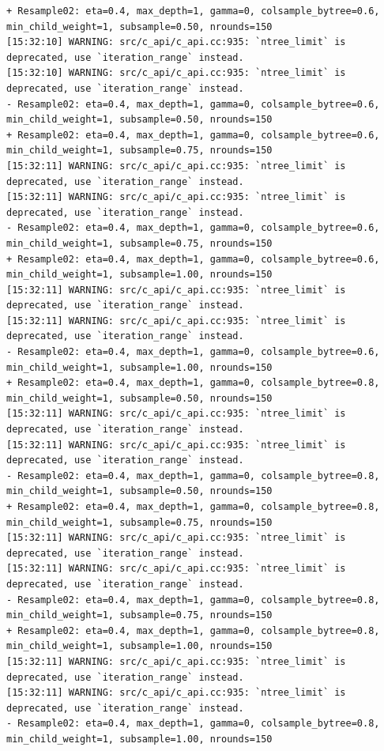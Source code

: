 \documentclass[
  letterpaper,
  DIV=11,
  numbers=noendperiod]{scrartcl}
\begin{document}
\begin{verbatim}
+ Resample02: eta=0.4, max_depth=1, gamma=0, colsample_bytree=0.6, min_child_weight=1, subsample=0.50, nrounds=150 
[15:32:10] WARNING: src/c_api/c_api.cc:935: `ntree_limit` is deprecated, use `iteration_range` instead.
[15:32:10] WARNING: src/c_api/c_api.cc:935: `ntree_limit` is deprecated, use `iteration_range` instead.
- Resample02: eta=0.4, max_depth=1, gamma=0, colsample_bytree=0.6, min_child_weight=1, subsample=0.50, nrounds=150 
+ Resample02: eta=0.4, max_depth=1, gamma=0, colsample_bytree=0.6, min_child_weight=1, subsample=0.75, nrounds=150 
[15:32:11] WARNING: src/c_api/c_api.cc:935: `ntree_limit` is deprecated, use `iteration_range` instead.
[15:32:11] WARNING: src/c_api/c_api.cc:935: `ntree_limit` is deprecated, use `iteration_range` instead.
- Resample02: eta=0.4, max_depth=1, gamma=0, colsample_bytree=0.6, min_child_weight=1, subsample=0.75, nrounds=150 
+ Resample02: eta=0.4, max_depth=1, gamma=0, colsample_bytree=0.6, min_child_weight=1, subsample=1.00, nrounds=150 
[15:32:11] WARNING: src/c_api/c_api.cc:935: `ntree_limit` is deprecated, use `iteration_range` instead.
[15:32:11] WARNING: src/c_api/c_api.cc:935: `ntree_limit` is deprecated, use `iteration_range` instead.
- Resample02: eta=0.4, max_depth=1, gamma=0, colsample_bytree=0.6, min_child_weight=1, subsample=1.00, nrounds=150 
+ Resample02: eta=0.4, max_depth=1, gamma=0, colsample_bytree=0.8, min_child_weight=1, subsample=0.50, nrounds=150 
[15:32:11] WARNING: src/c_api/c_api.cc:935: `ntree_limit` is deprecated, use `iteration_range` instead.
[15:32:11] WARNING: src/c_api/c_api.cc:935: `ntree_limit` is deprecated, use `iteration_range` instead.
- Resample02: eta=0.4, max_depth=1, gamma=0, colsample_bytree=0.8, min_child_weight=1, subsample=0.50, nrounds=150 
+ Resample02: eta=0.4, max_depth=1, gamma=0, colsample_bytree=0.8, min_child_weight=1, subsample=0.75, nrounds=150 
[15:32:11] WARNING: src/c_api/c_api.cc:935: `ntree_limit` is deprecated, use `iteration_range` instead.
[15:32:11] WARNING: src/c_api/c_api.cc:935: `ntree_limit` is deprecated, use `iteration_range` instead.
- Resample02: eta=0.4, max_depth=1, gamma=0, colsample_bytree=0.8, min_child_weight=1, subsample=0.75, nrounds=150 
+ Resample02: eta=0.4, max_depth=1, gamma=0, colsample_bytree=0.8, min_child_weight=1, subsample=1.00, nrounds=150 
[15:32:11] WARNING: src/c_api/c_api.cc:935: `ntree_limit` is deprecated, use `iteration_range` instead.
[15:32:11] WARNING: src/c_api/c_api.cc:935: `ntree_limit` is deprecated, use `iteration_range` instead.
- Resample02: eta=0.4, max_depth=1, gamma=0, colsample_bytree=0.8, min_child_weight=1, subsample=1.00, nrounds=150 

\end{verbatim}
\end{document}
